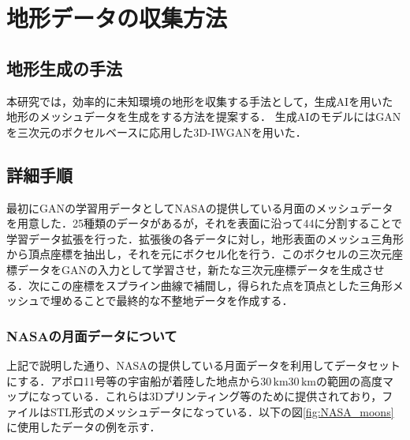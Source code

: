 \newpage
\section{地形データの収集方法}
\label{sec:method1}

\subsection{地形生成の手法}
本研究では，効率的に未知環境の地形を収集する手法として，生成AIを用いた地形のメッシュデータを生成をする方法を提案する．
生成AIのモデルにはGANを三次元のボクセルベースに応用した3D-IWGANを用いた．\cite{bunken1}

\subsection{詳細手順}
最初にGANの学習用データとしてNASAの提供している月面のメッシュデータを用意した．25種類のデータがあるが，それを表面に沿って4\times4に分割することで学習データ拡張を行った．拡張後の各データに対し，地形表面のメッシュ三角形から頂点座標を抽出し，それを元にボクセル化を行う．このボクセルの三次元座標データをGANの入力として学習させ，新たな三次元座標データを生成させる．次にこの座標をスプライン曲線で補間し，得られた点を頂点とした三角形メッシュで埋めることで最終的な不整地データを作成する．

\subsubsection{NASAの月面データについて}
上記で説明した通り、NASAの提供している月面データを利用してデータセットにする．アポロ11号等の宇宙船が着陸した地点から$30 \mathrm{\, km}$\times$30\mathrm{\, km}$の範囲の高度マップになっている．これらは3Dプリンティング等のために提供されており，ファイルはSTL形式のメッシュデータになっている．以下の図\ref{fig:NASA_moons}に使用したデータの例を示す．

